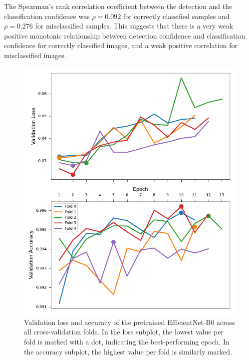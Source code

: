 The Spearman's rank correlation coefficient between the detection and the classification confidence was $\rho = 0.092$ for correctly classified samples and $\rho = 0.276$ for misclassified samples.
This suggests that there is a very weak positive monotonic relationship between detection confidence and classification confidence for correctly classified images, and a weak positive correlation for misclassified images.

\begin{figure}[ht]
\centering
\includegraphics{figures/training_metrics_best_model.pdf}
\caption{
    Validation loss and accuracy of the pretrained EfficientNet-B0 across all cross-validation folds.
    In the loss subplot, the lowest value per fold is marked with a dot, indicating the best-performing epoch.
    In the accuracy subplot, the highest value per fold is similarly marked.
    }
\label{fig:training_metrics_best_model}
\end{figure}



